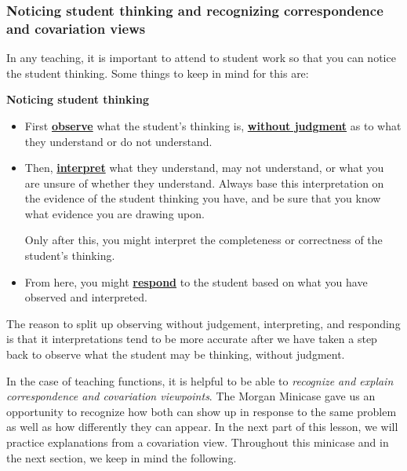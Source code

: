 \documentclass[11pt]{article}
\renewcommand\emph[1]{\underline{\bf{#1}}} %
\theoremstyle{definition}
\begin{document}
\subsubsection{Noticing student thinking and recognizing correspondence and covariation views}
In any teaching, it is important to attend to student work so that you can notice the student thinking. Some things to keep in mind for this are:

\begin{mdframed}\raggedright
\begin{center} {\bf Noticing student thinking} \end{center}
	\begin{itemize}
	\item First \emph{observe} what the student's thinking is, \emph{without judgment} as to what they understand or do not understand. 
	\item Then, \emph{interpret} what they understand, may not understand, or what you are unsure of whether they understand. Always base this interpretation on the evidence of the student thinking you have, and be sure that you know what evidence you are drawing upon.
		
	Only after this, you might interpret the completeness or correctness of the student's thinking. 
	\item From here, you might \emph{respond} to the student based on what you have observed and interpreted. 
	\end{itemize}
\end{mdframed}

The reason to split up observing without judgement, interpreting, and responding is that it interpretations tend to be more accurate after we have taken a step back to observe what the student may be thinking, without judgment.

In the case of teaching functions, it is helpful to be able to {\it recognize and explain correspondence and covariation viewpoints}. The Morgan Minicase gave us an opportunity to recognize how both can show up in response to the same problem as well as how differently they can appear. In the next part of this lesson, we will practice explanations from a covariation view. Throughout this minicase and in the next section, we keep in mind the following. 
\end{document}
